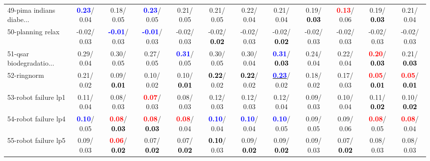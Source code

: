 \begin{table}[h]
\begin{center}
{\begin{tabular}{lc|c|c|c|c|c|c|c|c|c|c}
49-pima indians diabe... & \textcolor{blue}{\textbf{  0.23}}/  0.04 &   0.18/  0.05 & \textcolor{blue}{\textbf{  0.23}}/  0.05 &   0.21/  0.05 &   0.21/  0.05 &   0.22/  0.04 &   0.21/  0.04 &   0.19/\textcolor{black}{\textbf{  0.03}} & \textcolor{red}{\textbf{  0.13}}/  0.06 &   0.19/\textcolor{black}{\textbf{  0.03}} &   0.21/  0.04 \\
50-planning relax &  -0.02/  0.03 & \textcolor{blue}{\textbf{ -0.01}}/  0.03 & \textcolor{blue}{\textbf{ -0.01}}/  0.03 &  -0.02/  0.03 &  -0.02/\textcolor{black}{\textbf{  0.02}} &  -0.02/  0.03 &  -0.02/\textcolor{black}{\textbf{  0.02}} &  -0.02/  0.03 &  -0.02/  0.03 &  -0.02/  0.03 &  -0.02/  0.03 \\
51-qsar biodegradatio... &   0.29/  0.04 &   0.30/  0.05 &   0.27/  0.05 & \textcolor{blue}{\textbf{  0.31}}/  0.05 &   0.30/  0.05 &   0.30/  0.04 & \textcolor{blue}{\textbf{  0.31}}/\textcolor{black}{\textbf{  0.03}} &   0.24/  0.04 &   0.22/  0.04 & \textcolor{red}{\textbf{  0.20}}/\textcolor{black}{\textbf{  0.03}} &   0.21/\textcolor{black}{\textbf{  0.03}} \\
52-ringnorm &   0.21/  0.02 &   0.09/\textcolor{black}{\textbf{  0.01}} &   0.10/  0.02 &   0.10/\textcolor{black}{\textbf{  0.01}} & \textcolor{black}{\textbf{  0.22}}/  0.02 & \textcolor{black}{\textbf{  0.22}}/  0.02 & \underline{\textcolor{blue}{\textbf{  0.23}}}/  0.02 &   0.18/  0.02 &   0.17/  0.03 & \textcolor{red}{\textbf{  0.05}}/\textcolor{black}{\textbf{  0.01}} & \textcolor{red}{\textbf{  0.05}}/\textcolor{black}{\textbf{  0.01}} \\
53-robot failure lp1 &   0.11/  0.04 &   0.08/  0.03 & \textcolor{red}{\textbf{  0.07}}/  0.03 &   0.08/  0.03 &   0.12/  0.03 &   0.12/  0.03 &   0.12/  0.04 &   0.09/  0.03 &   0.10/  0.04 &   0.11/\textcolor{black}{\textbf{  0.02}} &   0.10/\textcolor{black}{\textbf{  0.02}} \\ \hline
54-robot failure lp4 & \textcolor{blue}{\textbf{  0.10}}/  0.05 & \textcolor{red}{\textbf{  0.08}}/\textcolor{black}{\textbf{  0.03}} & \textcolor{red}{\textbf{  0.08}}/\textcolor{black}{\textbf{  0.03}} & \textcolor{red}{\textbf{  0.08}}/  0.04 & \textcolor{blue}{\textbf{  0.10}}/  0.04 & \textcolor{blue}{\textbf{  0.10}}/  0.04 & \textcolor{blue}{\textbf{  0.10}}/  0.05 &   0.09/  0.05 &   0.09/  0.06 & \textcolor{red}{\textbf{  0.08}}/  0.05 & \textcolor{red}{\textbf{  0.08}}/  0.04 \\
55-robot failure lp5 &   0.09/  0.03 & \textcolor{red}{\textbf{  0.06}}/\textcolor{black}{\textbf{  0.02}} &   0.07/\textcolor{black}{\textbf{  0.02}} &   0.07/\textcolor{black}{\textbf{  0.02}} & \textcolor{black}{\textbf{  0.10}}/  0.03 &   0.09/\textcolor{black}{\textbf{  0.02}} &   0.09/\textcolor{black}{\textbf{  0.02}} &   0.09/  0.03 &   0.07/\textcolor{black}{\textbf{  0.02}} &   0.08/  0.03 &   0.08/  0.03 \\

\end{tabular}}
\end{center}
\end{table}
